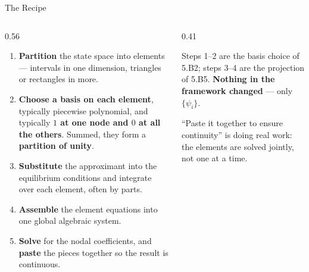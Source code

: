 \begin{frame}{The Recipe}
\begin{columns}[T]
\begin{column}{0.56\textwidth}
\small
\begin{enumerate}\small\setlength{\itemsep}{1.2mm}
  \item \textbf{Partition} the state space into elements --- intervals in one dimension, triangles or rectangles in more.
  \item \textbf{Choose a basis on each element}, typically piecewise polynomial, and typically \textbf{$1$ at one node and $0$ at all the others}. Summed, they form a \textbf{partition of unity}.
  \item \textbf{Substitute} the approximant into the equilibrium conditions and integrate over each element, often by parts.
  \item \textbf{Assemble} the element equations into one global algebraic system.
  \item \textbf{Solve} for the nodal coefficients, and \textbf{paste} the pieces together so the result is continuous.
\end{enumerate}
\end{column}
\begin{column}{0.41\textwidth}
\begin{takeawaybox}\footnotesize
Steps 1--2 are the basis choice of 5.B2; steps 3--4 are the projection of 5.B5. \textbf{Nothing in the framework changed} --- only $\{\psi_i\}$.
\end{takeawaybox}
\medskip
\begin{examplebox}\footnotesize
``Paste it together to ensure continuity'' is doing real work: the elements are solved jointly, not one at a time.
\end{examplebox}
\end{column}
\end{columns}
\vspace{1mm}
\end{frame}

